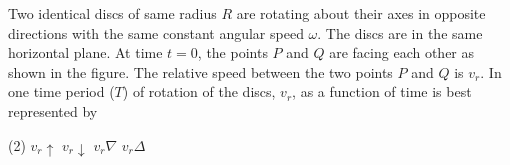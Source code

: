 
\item Two identical discs of same radius \( R \) are rotating about their axes in opposite directions with the same constant angular speed \( \omega \). The discs are in the same horizontal plane. At time \( t = 0 \), the points \( P \) and \( Q \) are facing each other as shown in the figure. The relative speed between the two points \( P \) and \( Q \) is \( v_r \). In one time period (\( T \)) of rotation of the discs, \( v_r \), as a function of time is best represented by
    \begin{center}
    \end{center}
    \begin{tasks}(2)
        \task \( v_r \uparrow \)
        \task \( v_r \downarrow \)
        \task \( v_r \nabla \)
        \task \( v_r \Delta \)
    \end{tasks}
